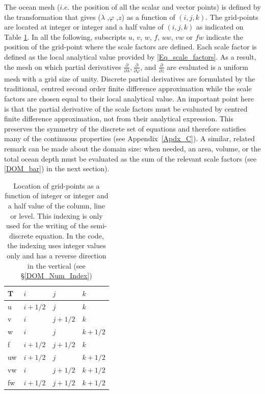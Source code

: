 The ocean mesh ($i.e.$ the position of all the scalar and vector points) is defined 
by the transformation that gives ($\lambda$ ,$\varphi$ ,$z$) as a function of $(i,j,k)$. 
The grid-points are located at integer or integer and a half value of $(i,j,k)$ as 
indicated on Table \ref{Tab_cell}. In all the following, subscripts $u$, $v$, $w$, 
$f$, $uw$, $vw$ or $fw$ indicate the position of the grid-point where the scale 
factors are defined. Each scale factor is defined as the local analytical value 
provided by \eqref{Eq_scale_factors}. As a result, the mesh on which partial 
derivatives $\frac{\partial}{\partial \lambda}, \frac{\partial}{\partial \varphi}$, and 
$\frac{\partial}{\partial z} $ are evaluated is a uniform mesh with a grid size of unity. 
Discrete partial derivatives are formulated by the traditional, centred second order 
finite difference approximation while the scale factors are chosen equal to their 
local analytical value. An important point here is that the partial derivative of the 
scale factors must be evaluated by centred finite difference approximation, not 
from their analytical expression. This preserves the symmetry of the discrete set 
of equations and therefore satisfies many of the continuous properties (see 
Appendix~\ref{Apdx_C}). A similar, related remark can be made about the domain 
size: when needed, an area, volume, or the total ocean depth must be evaluated 
as the sum of the relevant scale factors (see \eqref{DOM_bar}) in the next section). 

\begin{table}[!tb]
\begin{center} \begin{tabular}{|p{46pt}|p{56pt}|p{56pt}|p{56pt}|}
\hline
T	&$i$ 		& $j$		& $k$		 \\ \hline
u	& $i+1/2$	& $j$		& $k$	 	\\ \hline
v	& $i$	 	& $j+1/2$	& $k$	 	\\ \hline
w	& $i$	 	& $j$		& $k+1/2$ 	\\ \hline
f	& $i+1/2$ 	& $j+1/2$	& $k$	 	\\ \hline
uw	& $i+1/2$ 	& $j$		& $k+1/2$ 	\\ \hline
vw	& $i$	 	& $j+1/2$	& $k+1/2$ 	\\ \hline
fw	& $i+1/2$ 	& $j+1/2$	& $k+1/2$ 	\\ \hline
\end{tabular}
\caption{ \label{Tab_cell}
Location of grid-points as a function of integer or integer and a half value of the column, 
line or level. This indexing is only used for the writing of the semi-discrete equation. 
In the code, the indexing uses integer values only and has a reverse direction 
in the vertical (see \S\ref{DOM_Num_Index})}
\end{center}
\end{table}

